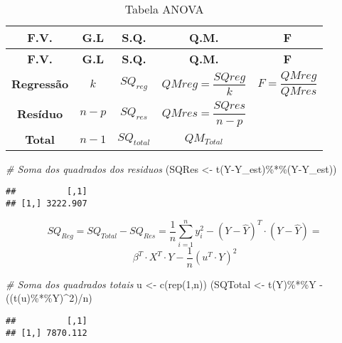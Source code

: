 \documentclass[
]{article}
\newenvironment{Shaded}{\begin{snugshade}}{\end{snugshade}}
\newcommand{\CommentTok}[1]{\textcolor[rgb]{0.56,0.35,0.01}{\textit{#1}}}
\newcommand{\DecValTok}[1]{\textcolor[rgb]{0.00,0.00,0.81}{#1}}
\newcommand{\FunctionTok}[1]{\textcolor[rgb]{0.00,0.00,0.00}{#1}}
\newcommand{\NormalTok}[1]{#1}
\newcommand{\OtherTok}[1]{\textcolor[rgb]{0.56,0.35,0.01}{#1}}
\newcommand{\SpecialCharTok}[1]{\textcolor[rgb]{0.00,0.00,0.00}{#1}}
\begin{document}
\begin{longtable}[]{@{}ccccc@{}}
\caption{Tabela ANOVA}\tabularnewline
\toprule
\textbf{F.V.} & \textbf{G.L} & \textbf{S.Q.} & \textbf{Q.M.} &
\textbf{F} \\
\midrule
\endfirsthead
\toprule
\textbf{F.V.} & \textbf{G.L} & \textbf{S.Q.} & \textbf{Q.M.} &
\textbf{F} \\
\midrule
\endhead
\textbf{Regressão} & \(k\) & \(SQ_{reg}\) & \(QMreg=\dfrac{SQreg}{k}\) &
\(F=\dfrac{QMreg}{QMres}\) \\
\textbf{Resíduo} & \(n-p\) & \(SQ_{res}\) & \(QMres=\dfrac{SQres}{n-p}\)
& \\
\textbf{Total} & \(n-1\) & \(SQ_{total}\) & \(QM_{Total}\) & \\
\bottomrule
\end{longtable}

\begin{Shaded}
\begin{Highlighting}[]
\CommentTok{\# Soma dos quadrados dos residuos  }
\NormalTok{(SQRes }\OtherTok{\textless{}{-}} \FunctionTok{t}\NormalTok{(Y}\SpecialCharTok{{-}}\NormalTok{Y\_est)}\SpecialCharTok{\%*\%}\NormalTok{(Y}\SpecialCharTok{{-}}\NormalTok{Y\_est))}
\end{Highlighting}
\end{Shaded}

\begin{verbatim}
##          [,1]
## [1,] 3222.907
\end{verbatim}

\[SQ_{Reg} = SQ_{Total} - SQ_{Res} = \frac 1n \sum_{i=1}^n y_i^2 - (Y-\hat{Y})^T\cdot(Y-\hat{Y}) =\]
\[\beta^T \cdot X^T \cdot Y - \frac1n (u^T \cdot Y)^2\]

\begin{Shaded}
\begin{Highlighting}[]
\CommentTok{\# Soma dos quadrados totais}
\NormalTok{u }\OtherTok{\textless{}{-}} \FunctionTok{c}\NormalTok{(}\FunctionTok{rep}\NormalTok{(}\DecValTok{1}\NormalTok{,n))}
\NormalTok{(SQTotal }\OtherTok{\textless{}{-}} \FunctionTok{t}\NormalTok{(Y)}\SpecialCharTok{\%*\%}\NormalTok{Y }\SpecialCharTok{{-}}\NormalTok{ ((}\FunctionTok{t}\NormalTok{(u)}\SpecialCharTok{\%*\%}\NormalTok{Y)}\SpecialCharTok{\^{}}\DecValTok{2}\NormalTok{)}\SpecialCharTok{/}\NormalTok{n)}
\end{Highlighting}
\end{Shaded}

\begin{verbatim}
##          [,1]
## [1,] 7870.112
\end{verbatim}
\end{document}
